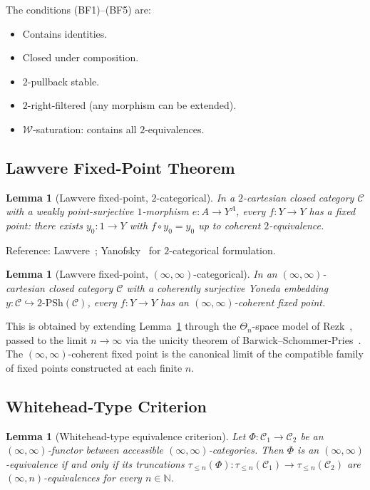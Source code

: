 \documentclass[11pt]{article}
\theoremstyle{plain}
\newtheorem{lemma}[theorem]{Lemma}
\theoremstyle{definition}
\newcommand{\cC}{\mathcal{C}}
\begin{document}
The conditions (BF1)--(BF5) are:
\begin{itemize}
\item[\textbf{(BF1)}] Contains identities.
\item[\textbf{(BF2)}] Closed under composition.
\item[\textbf{(BF3)}] $2$-pullback stable.
\item[\textbf{(BF4)}] $2$-right-filtered (any morphism can be extended).
\item[\textbf{(BF5)}] $\mathcal{W}$-saturation: contains all $2$-equivalences.
\end{itemize}

\subsection{Lawvere Fixed-Point Theorem}

\begin{lemma}[Lawvere fixed-point, $2$-categorical]\label{lem:lawvere-2}
In a $2$-cartesian closed category $\cC$ with a weakly point-surjective $1$-morphism $e : A \to Y^A$, every $f : Y \to Y$ has a fixed point: there exists $y_0 : 1 \to Y$ with $f \circ y_0 = y_0$ up to coherent $2$-equivalence.
\end{lemma}

Reference: Lawvere~\cite{Lawvere1969}; Yanofsky~\cite{Yanofsky2003} for $2$-categorical formulation.

\begin{lemma}[Lawvere fixed-point, $(\infty, \infty)$-categorical]\label{lem:lawvere-inf}
In an $(\infty, \infty)$-cartesian closed category $\cC$ with a coherently surjective Yoneda embedding $y : \cC \hookrightarrow 2\text{-}\mathrm{PSh}(\cC)$, every $f : Y \to Y$ has an $(\infty, \infty)$-coherent fixed point.
\end{lemma}

This is obtained by extending Lemma~\ref{lem:lawvere-2} through the $\Theta_n$-space model of Rezk~\cite{Rezk2010}, passed to the limit $n \to \infty$ via the unicity theorem of Barwick--Schommer-Pries~\cite{BarwickSchommerPries2021}. The $(\infty, \infty)$-coherent fixed point is the canonical limit of the compatible family of fixed points constructed at each finite $n$.

\subsection{Whitehead-Type Criterion}

\begin{lemma}[Whitehead-type equivalence criterion]\label{lem:whitehead}
Let $\Phi : \cC_1 \to \cC_2$ be an $(\infty, \infty)$-functor between accessible $(\infty, \infty)$-categories. Then $\Phi$ is an $(\infty, \infty)$-equivalence if and only if its truncations $\tau_{\leq n}(\Phi) : \tau_{\leq n}(\cC_1) \to \tau_{\leq n}(\cC_2)$ are $(\infty, n)$-equivalences for every $n \in \mathbb{N}$.
\end{lemma}
\end{document}

